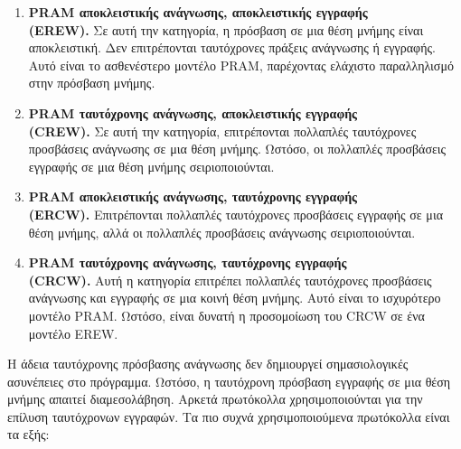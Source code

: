 \documentclass[12pt,a4paper]{article}
\begin{document}
\begin{enumerate}
    \item \textbf{\foreignlanguage{english}{PRAM} αποκλειστικής ανάγνωσης, αποκλειστικής εγγραφής\\ \foreignlanguage{english}{(EREW)}.}
    Σε αυτή την κατηγορία, η πρόσβαση σε μια θέση μνήμης είναι αποκλειστική.
    Δεν επιτρέπονται ταυτόχρονες πράξεις ανάγνωσης ή εγγραφής. Αυτό είναι το
    ασθενέστερο μοντέλο \foreignlanguage{english}{PRAM}, παρέχοντας ελάχιστο
    παραλληλισμό στην πρόσβαση μνήμης.

    \item \textbf{\foreignlanguage{english}{PRAM} ταυτόχρονης ανάγνωσης, αποκλειστικής εγγραφής\\ \foreignlanguage{english}{(CREW)}.}
    Σε αυτή την κατηγορία, επιτρέπονται πολλαπλές ταυτόχρονες προσβάσεις
    ανάγνωσης σε μια θέση μνήμης. Ωστόσο, οι πολλαπλές προσβάσεις εγγραφής
    σε μια θέση μνήμης σειριοποιούνται.

    \item \textbf{\foreignlanguage{english}{PRAM} αποκλειστικής ανάγνωσης, ταυτόχρονης εγγραφής\\ \foreignlanguage{english}{(ERCW)}.}
    Επιτρέπονται πολλαπλές ταυτόχρονες προσβάσεις εγγραφής σε μια θέση μνήμης,
    αλλά οι πολλαπλές προσβάσεις ανάγνωσης σειριοποιούνται.

    \item \textbf{\foreignlanguage{english}{PRAM} ταυτόχρονης ανάγνωσης, ταυτόχρονης εγγραφής\\ \foreignlanguage{english}{(CRCW)}.}
    Αυτή η κατηγορία επιτρέπει πολλαπλές ταυτόχρονες προσβάσεις ανάγνωσης και
    εγγραφής σε μια κοινή θέση μνήμης. Αυτό είναι το ισχυρότερο μοντέλο \foreignlanguage{english}{PRAM}.
    Ωστόσο, είναι δυνατή η προσομοίωση του \foreignlanguage{english}{CRCW} σε ένα μοντέλο \foreignlanguage{english}{EREW}.
\end{enumerate}

Η άδεια ταυτόχρονης πρόσβασης ανάγνωσης δεν δημιουργεί σημασιολογικές
ασυνέπειες στο πρόγραμμα. Ωστόσο, η ταυτόχρονη πρόσβαση εγγραφής σε μια θέση
μνήμης απαιτεί διαμεσολάβηση. Αρκετά πρωτόκολλα χρησιμοποιούνται για την επίλυση
ταυτόχρονων εγγραφών. Τα πιο συχνά χρησιμοποιούμενα πρωτόκολλα είναι τα εξής:
\end{document}
